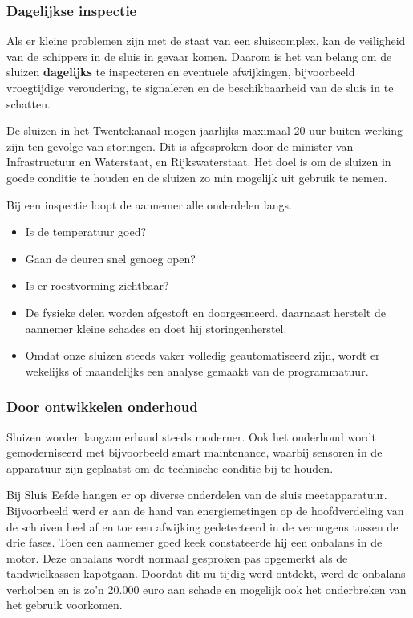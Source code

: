 \documentclass[../literatuuronderzoek.tex]{subfiles}
\begin{document}
\subsubsection{Dagelijkse inspectie}
Als er kleine problemen zijn met de staat van een sluiscomplex, kan de veiligheid van de schippers in de sluis in gevaar komen. Daarom is het van belang om de sluizen \textbf{dagelijks} te inspecteren en eventuele afwijkingen, bijvoorbeeld vroegtijdige veroudering, te signaleren en de beschikbaarheid van de sluis in te schatten.
\cite{rws_belang_onderhoud}

De sluizen in het Twentekanaal mogen jaarlijks maximaal 20 uur buiten werking zijn ten gevolge van storingen. Dit is afgesproken door de minister van Infrastructuur en Waterstaat, en Rijkswaterstaat. Het doel is om de sluizen in goede conditie te houden en de sluizen zo min mogelijk uit gebruik te nemen.
\cite{rws_belang_onderhoud}


Bij een inspectie loopt de aannemer alle onderdelen langs.
\begin{itemize}
    \item Is de temperatuur goed?
    \item Gaan de deuren snel genoeg open?
    \item Is er roestvorming zichtbaar? \cite{wcm_onderhoud}
    \item De fysieke delen worden afgestoft en doorgesmeerd, daarnaast herstelt de aannemer kleine schades en doet hij storingenherstel.
    \item Omdat onze sluizen steeds vaker volledig geautomatiseerd zijn, wordt er wekelijks of maandelijks een analyse gemaakt van de programmatuur.
\end{itemize}
\cite{rws_belang_onderhoud}




\subsubsection{Door ontwikkelen onderhoud}
Sluizen worden langzamerhand steeds moderner. Ook het onderhoud wordt gemoderniseerd met bijvoorbeeld smart maintenance, waarbij sensoren in de apparatuur zijn geplaatst om de technische conditie bij te houden.
\cite{rws_belang_onderhoud}


\vspace{1em}

Bij Sluis Eefde hangen er op diverse onderdelen van de sluis meetapparatuur. Bijvoorbeeld werd er aan de hand van energiemetingen op de hoofdverdeling van de schuiven heel af en toe een afwijking gedetecteerd in de vermogens tussen de drie fases.
Toen een aannemer goed keek constateerde hij een onbalans in de motor. Deze onbalans wordt normaal gesproken pas opgemerkt als de tandwielkassen kapotgaan. Doordat dit nu tijdig werd ontdekt, werd de onbalans verholpen en is zo'n 20.000 euro aan schade en mogelijk ook het onderbreken van het gebruik voorkomen.
\cite{wcm_onderhoud}
\end{document}

